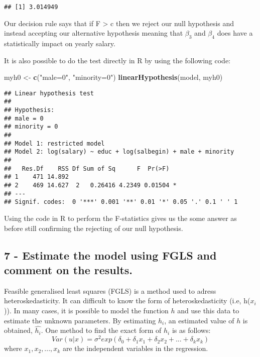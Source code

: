 \documentclass[
]{article}
\newenvironment{Shaded}{\begin{snugshade}}{\end{snugshade}}
\newcommand{\FunctionTok}[1]{\textcolor[rgb]{0.13,0.29,0.53}{\textbf{#1}}}
\newcommand{\NormalTok}[1]{#1}
\newcommand{\OtherTok}[1]{\textcolor[rgb]{0.56,0.35,0.01}{#1}}
\newcommand{\StringTok}[1]{\textcolor[rgb]{0.31,0.60,0.02}{#1}}
\begin{document}
\begin{verbatim}
## [1] 3.014949
\end{verbatim}

Our decision rule says that if F \textgreater{} c then we reject our
null hypothesis and instead accepting our alternative hypothesis meaning
that \(\beta_3\) and \(\beta_4\) does have a statistically impact on
yearly salary.

It is also possible to do the test directly in R by using the following
code:

\begin{Shaded}
\begin{Highlighting}[]
\NormalTok{myh0 }\OtherTok{\textless{}{-}} \FunctionTok{c}\NormalTok{(}\StringTok{"male=0"}\NormalTok{, }\StringTok{"minority=0"}\NormalTok{)}
\FunctionTok{linearHypothesis}\NormalTok{(model, myh0)}
\end{Highlighting}
\end{Shaded}

\begin{verbatim}
## Linear hypothesis test
## 
## Hypothesis:
## male = 0
## minority = 0
## 
## Model 1: restricted model
## Model 2: log(salary) ~ educ + log(salbegin) + male + minority
## 
##   Res.Df    RSS Df Sum of Sq      F  Pr(>F)  
## 1    471 14.892                              
## 2    469 14.627  2   0.26416 4.2349 0.01504 *
## ---
## Signif. codes:  0 '***' 0.001 '**' 0.01 '*' 0.05 '.' 0.1 ' ' 1
\end{verbatim}

Using the code in R to perform the F-statistics gives us the some answer
as before still confirming the rejecting of our null hypothesis.

\subsection{7 - Estimate the model using FGLS and comment on the
results.}\label{estimate-the-model-using-fgls-and-comment-on-the-results.}

Feasible generalised least squares (FGLS) is a method used to adress
heteroskedasticity. It can difficult to know the form of
heteroskedasticity (i.e, h(\(x_i\))). In many cases, it is possible to
model the function \(h\) and use this data to estimate the unknown
parameters. By estimating \(h_i\), an estimated value of \(h\) is
obtained, \(\hat{h_i}\). One method to find the exact form of \(h_i\) is
as follows:
\[Var(u|x)=\sigma^2exp(\delta_0+\delta_1x_1+\delta_2x_2+...+\delta_kx_k)\]
where \(x_1,x_2,...,x_k\) are the independent variables in the
regression.
\end{document}
